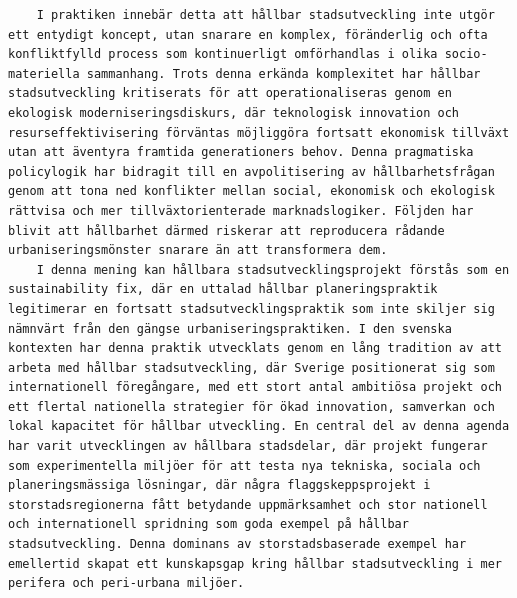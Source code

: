 \begin{casestudySection}
\begin{lstlisting}
    I praktiken innebär detta att hållbar stadsutveckling inte utgör ett entydigt koncept, utan snarare en komplex, föränderlig och ofta konfliktfylld process som kontinuerligt omförhandlas i olika socio-materiella sammanhang. Trots denna erkända komplexitet har hållbar stadsutveckling kritiserats för att operationaliseras genom en ekologisk moderniseringsdiskurs, där teknologisk innovation och resurseffektivisering förväntas möjliggöra fortsatt ekonomisk tillväxt utan att äventyra framtida generationers behov. Denna pragmatiska policylogik har bidragit till en avpolitisering av hållbarhetsfrågan genom att tona ned konflikter mellan social, ekonomisk och ekologisk rättvisa och mer tillväxtorienterade marknadslogiker. Följden har blivit att hållbarhet därmed riskerar att reproducera rådande urbaniseringsmönster snarare än att transformera dem.
    I denna mening kan hållbara stadsutvecklingsprojekt förstås som en sustainability fix, där en uttalad hållbar planeringspraktik legitimerar en fortsatt stadsutvecklingspraktik som inte skiljer sig nämnvärt från den gängse urbaniseringspraktiken. I den svenska kontexten har denna praktik utvecklats genom en lång tradition av att arbeta med hållbar stadsutveckling, där Sverige positionerat sig som internationell föregångare, med ett stort antal ambitiösa projekt och ett flertal nationella strategier för ökad innovation, samverkan och lokal kapacitet för hållbar utveckling. En central del av denna agenda har varit utvecklingen av hållbara stadsdelar, där projekt fungerar som experimentella miljöer för att testa nya tekniska, sociala och planeringsmässiga lösningar, där några flaggskeppsprojekt i storstadsregionerna fått betydande uppmärksamhet och stor nationell och internationell spridning som goda exempel på hållbar stadsutveckling. Denna dominans av storstadsbaserade exempel har emellertid skapat ett kunskapsgap kring hållbar stadsutveckling i mer perifera och peri-urbana miljöer.

\end{lstlisting}
\end{casestudySection}
